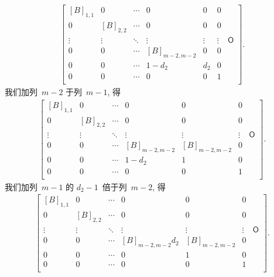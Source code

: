 \documentclass[../libro.tex]{subfiles}
\begin{document}
\begin{align*}
    \begin{bmatrix}
        [B]_{1,1} & 0         & \cdots & 0             & 0      & 0      & {}         \\
        0         & [B]_{2,2} & \cdots & 0             & 0      & 0      & {}         \\
        \vdots    & \vdots    & \ddots & \vdots        & \vdots & \vdots & \mathsf{O} \\
        0         & 0         & \cdots & [B]_{m-2,m-2} & 0      & 0      & {}         \\
        0         & 0         & \cdots & 1 - d_2       & d_2    & 0      & {}         \\
        0         & 0         & \cdots & 0             & 0      & 1      & {}         \\
    \end{bmatrix}.
\end{align*}
我们加列~\(m-2\) 于列~\(m-1\), 得
\begin{align*}
    \begin{bmatrix}
        [B]_{1,1} & 0         & \cdots & 0             & 0             & 0      & {}         \\
        0         & [B]_{2,2} & \cdots & 0             & 0             & 0      & {}         \\
        \vdots    & \vdots    & \ddots & \vdots        & \vdots        & \vdots & \mathsf{O} \\
        0         & 0         & \cdots & [B]_{m-2,m-2} & [B]_{m-2,m-2} & 0      & {}         \\
        0         & 0         & \cdots & 1 - d_2       & 1             & 0      & {}         \\
        0         & 0         & \cdots & 0             & 0             & 1      & {}         \\
    \end{bmatrix}.
\end{align*}
我们加列~\(m-1\) 的 \(d_2 - 1\)~倍于列~\(m-2\), 得
\begin{align*}
    \begin{bmatrix}
        [B]_{1,1} & 0         & \cdots & 0                 & 0             & 0      & {}         \\
        0         & [B]_{2,2} & \cdots & 0                 & 0             & 0      & {}         \\
        \vdots    & \vdots    & \ddots & \vdots            & \vdots        & \vdots & \mathsf{O} \\
        0         & 0         & \cdots & [B]_{m-2,m-2} d_2 & [B]_{m-2,m-2} & 0      & {}         \\
        0         & 0         & \cdots & 0                 & 1             & 0      & {}         \\
        0         & 0         & \cdots & 0                 & 0             & 1      & {}         \\
    \end{bmatrix}.
\end{align*}
\end{document}
